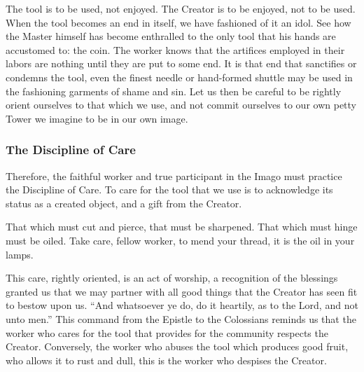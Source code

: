 The tool is to be used, not enjoyed. The Creator is to be enjoyed, not to be used.
When the tool becomes an end in itself, we have fashioned of it an idol.
See how the Master himself has become enthralled to the only tool that his hands are accustomed to: the coin.
The worker knows that the artifices employed in their labors are nothing until they are put to some end.
It is that end that sanctifies or condemns the tool, even the finest needle or hand-formed shuttle may be used in the fashioning garments of shame and sin.
Let us then be careful to be rightly orient ourselves to that which we use, and not commit ourselves to our own petty Tower we imagine to be in our own image.

\subsubsection{The Discipline of Care}
Therefore, the faithful worker and true participant in the Imago must practice the Discipline of Care.
To care for the tool that we use is to acknowledge its status as a created object, and a gift from the Creator.

That which must cut and pierce, that must be sharpened.
That which must hinge must be oiled.
Take care, fellow worker, to mend your thread, it is the oil in your lamps.

This care, rightly oriented, is an act of worship, a recognition of the blessings granted us that we may partner with all good things that the Creator has seen fit to bestow upon us.
``And whatsoever ye do, do it heartily, as to the Lord, and not unto men.''
This command from the Epistle to the Colossians reminds us that the worker who cares for the tool that provides for the community respects the Creator.
Conversely, the worker who abuses the tool which produces good fruit, who allows it to rust and dull, this is the worker who despises the Creator.